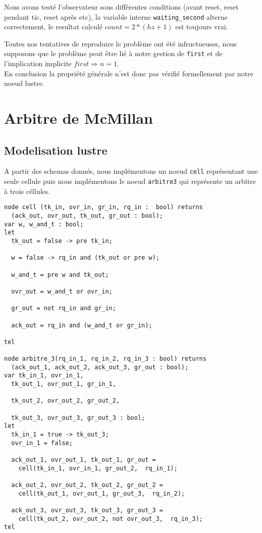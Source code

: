 \documentclass[a4paper]{article}
\begin{document}
Nous avons testé l'observateur sous différentes conditions (avant reset, reset 
pendant tic, reset après etc), la variable interne \texttt{waiting\_second}
alterne correctement, le resultat calculé $count = 2 * (hz + 1)$ est toujours vrai.

Toutes nos tentatives de reproduire le problème ont été infructueuses, nous supposons
que le problème peut être lié à notre gestion de \texttt{first} et de l'implication
implicite $first \Rightarrow n = 1$. \\

En conclusion la propriété générale n'est donc pas vérifié formellement par notre noeud lustre.

\section{Arbitre de McMillan}
\subsection{Modelisation lustre}
A partir des schemas donnés, nous implémentons un noeud \texttt{cell} représentant 
une seule cellule puis nous implémentons le noeud \texttt{arbitre3} qui représente
un arbitre à trois céllules.\\

\begin{verbatim}
node cell (tk_in, ovr_in, gr_in, rq_in :  bool) returns
  (ack_out, ovr_out, tk_out, gr_out : bool);
var w, w_and_t : bool;  
let 
  tk_out = false -> pre tk_in;  

  w = false -> rq_in and (tk_out or pre w);

  w_and_t = pre w and tk_out;

  ovr_out = w_and_t or ovr_in;

  gr_out = not rq_in and gr_in;
  
  ack_out = rq_in and (w_and_t or gr_in); 

tel

node arbitre_3(rq_in_1, rq_in_2, rq_in_3 : bool) returns 
  (ack_out_1, ack_out_2, ack_out_3, gr_out : bool);
var tk_in_1, ovr_in_1,
  tk_out_1, ovr_out_1, gr_in_1,
    
  tk_out_2, ovr_out_2, gr_out_2,

  tk_out_3, ovr_out_3, gr_out_3 : bool;
let
  tk_in_1 = true -> tk_out_3;
  ovr_in_1 = false;

  ack_out_1, ovr_out_1, tk_out_1, gr_out = 
    cell(tk_in_1, ovr_in_1, gr_out_2,  rq_in_1);

  ack_out_2, ovr_out_2, tk_out_2, gr_out_2 = 
    cell(tk_out_1, ovr_out_1, gr_out_3,  rq_in_2);

  ack_out_3, ovr_out_3, tk_out_3, gr_out_3 = 
    cell(tk_out_2, ovr_out_2, not ovr_out_3,  rq_in_3);
tel
\end{verbatim}
\end{document}
